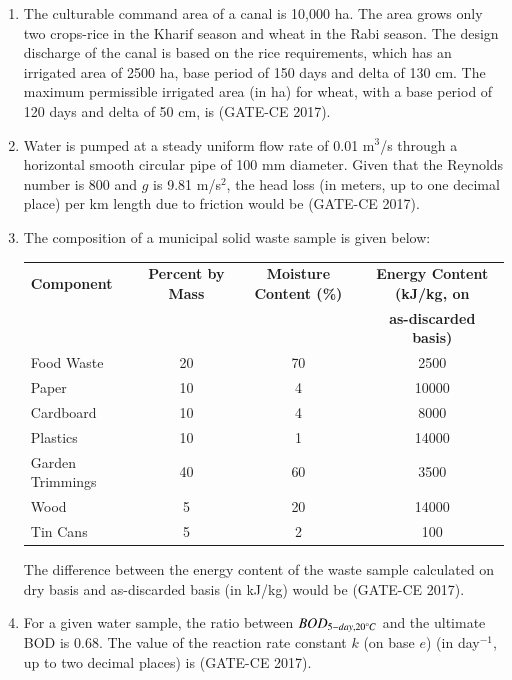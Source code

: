 \documentclass[journal,12pt,onecolumn]{article}
\theoremstyle{remark}
\begin{document}
\begin{enumerate}
    \item The culturable command area of a canal is 10,000 ha. The area grows only two crops-rice in the Kharif season and wheat in the Rabi season. The design discharge of the canal is based on the rice requirements, which has an irrigated area of 2500 ha, base period of 150 days and delta of 130 cm. The maximum permissible irrigated area (in ha) for wheat, with a base period of 120 days and delta of 50 cm, is \underline{\hspace{3cm}} \hfill (GATE-CE 2017).

    \item Water is pumped at a steady uniform flow rate of 0.01 m$^3$/s through a horizontal smooth circular pipe of 100 mm diameter. Given that the Reynolds number is 800 and $ g $ is 9.81 m/s$^2$, the head loss (in meters, up to one decimal place) per km length due to friction would be \underline{\hspace{3cm}} \hfill (GATE-CE 2017).

    \item The composition of a municipal solid waste sample is given below:
    \begin{table}[H]
    \centering
    \begin{tabular}{|l|c|c|c|}
    \hline
    \textbf{Component} & \textbf{Percent by Mass} & \textbf{Moisture Content (\%)} & \textbf{Energy Content (kJ/kg, on} \\ & & &  \textbf{as-discarded basis)} \\
    \hline
    Food Waste & 20 & 70 & 2500 \\
    Paper & 10 & 4 & 10000 \\
    Cardboard & 10 & 4 & 8000 \\
    Plastics & 10 & 1 & 14000 \\
    Garden Trimmings & 40 & 60 & 3500 \\
    Wood & 5 & 20 & 14000 \\
    Tin Cans & 5 & 2 & 100 \\
    \hline
    \end{tabular}
    \end{table}
    The difference between the energy content of the waste sample calculated on dry basis and as-discarded basis (in kJ/kg) would be \underline{\hspace{3cm}} \hfill (GATE-CE 2017).

    \item For a given water sample, the ratio between $BOD_{5-day,20\degree C}$ and the ultimate BOD is 0.68. The value of the reaction rate constant $ k $ (on base $ e $) (in day$^{-1}$, up to two decimal places) is \underline{\hspace{3cm}} \hfill (GATE-CE 2017).


\end{enumerate}
\end{document}
